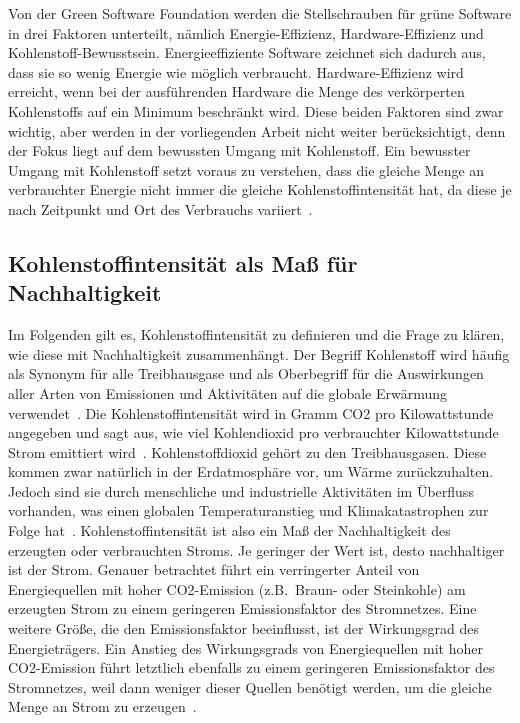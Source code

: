 Von der Green Software Foundation werden die Stellschrauben für grüne Software in drei Faktoren unterteilt, nämlich Energie-Effizienz, Hardware-Effizienz und Kohlenstoff-Bewusstsein.
Energieeffiziente Software zeichnet sich dadurch aus, dass sie so wenig Energie wie möglich verbraucht.
Hardware-Effizienz wird erreicht, wenn bei der ausführenden Hardware die Menge des verkörperten Kohlenstoffs auf ein Minimum beschränkt wird.
Diese beiden Faktoren sind zwar wichtig, aber werden in der vorliegenden Arbeit nicht weiter berücksichtigt, denn der Fokus liegt auf dem bewussten Umgang mit Kohlenstoff.
Ein bewusster Umgang mit Kohlenstoff setzt voraus zu verstehen, dass die gleiche Menge an verbrauchter Energie nicht immer die gleiche Kohlenstoffintensität hat, da diese je nach Zeitpunkt und Ort des Verbrauchs variiert~\cite{GreenSoftwareFoundation.2022}.

\subsection{Kohlenstoffintensität als Maß für Nachhaltigkeit}
Im Folgenden gilt es, Kohlenstoffintensität zu definieren und die Frage zu klären, wie diese mit Nachhaltigkeit zusammenhängt.
Der Begriff Kohlenstoff wird häufig als Synonym für alle Treibhausgase und als Oberbegriff für die Auswirkungen aller Arten von Emissionen und Aktivitäten auf die globale Erwärmung verwendet~\cite{GreenSoftwareFoundation.2022}.
Die Kohlenstoffintensität wird in Gramm CO2 pro Kilowattstunde angegeben und sagt aus, wie viel Kohlendioxid pro verbrauchter Kilowattstunde Strom emittiert wird~\cite{LyndonRuff.20220420T15:34:17.000Z}.
Kohlenstoffdioxid gehört zu den Treibhausgasen.
Diese kommen zwar natürlich in der Erdatmosphäre vor, um Wärme zurückzuhalten.
Jedoch sind sie durch menschliche und industrielle Aktivitäten im Überfluss vorhanden, was einen globalen Temperaturanstieg und Klimakatastrophen zur Folge hat~\cite{Currie.2024}.
Kohlenstoffintensität ist also ein Maß der Nachhaltigkeit des erzeugten oder verbrauchten Stroms.
Je geringer der Wert ist, desto nachhaltiger ist der Strom.
Genauer betrachtet führt ein verringerter Anteil von Energiequellen mit hoher CO2-Emission (z.B.\ Braun- oder Steinkohle) am erzeugten Strom zu einem geringeren Emissionsfaktor des Stromnetzes.
Eine weitere Größe, die den Emissionsfaktor beeinflusst, ist der Wirkungsgrad des Energieträgers.
Ein Anstieg des Wirkungsgrads von Energiequellen mit hoher CO2-Emission führt letztlich ebenfalls zu einem geringeren Emissionsfaktor des Stromnetzes, weil dann weniger dieser Quellen benötigt werden, um die gleiche Menge an Strom zu erzeugen~\cite{Icha.2020}.

